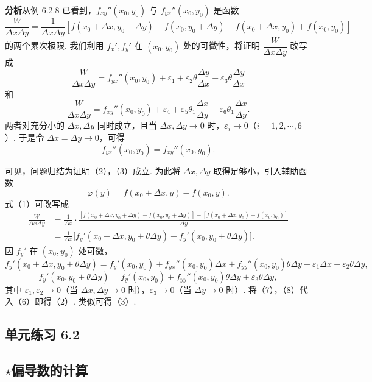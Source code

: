 \documentclass[UTF8,12pt,a4paper,fontset=fandol]{ctexart}
\begin{document}
\noindent\textbf{分析}\quad 从例 6.2.8 已看到，$f_{xy}''(x_0,y_0)$ 与 $f_{yx}''(x_0,y_0)$ 是函数
\[
  \frac{W}{\Delta x\Delta y}
  =\frac1{\Delta x\Delta y}[f(x_0+\Delta x,y_0+\Delta y)-f(x_0,y_0+\Delta y)-f(x_0+\Delta x,y_0)+f(x_0,y_0)] \tag{1}
\]
的两个累次极限. 我们利用 $f_x',f_y'$ 在 $(x_0,y_0)$ 处的可微性，将证明 $\dfrac{W}{\Delta x\Delta y}$ 改写成
\[
  \frac{W}{\Delta x\Delta y}=f_{yx}''(x_0,y_0)+\varepsilon_1+\varepsilon_2\theta\frac{\Delta y}{\Delta x}-\varepsilon_3\theta\frac{\Delta y}{\Delta x} \tag{2}
\]
和
\[
  \frac{W}{\Delta x\Delta y}=f_{xy}''(x_0,y_0)+\varepsilon_4+\varepsilon_5\theta_1\frac{\Delta x}{\Delta y}-\varepsilon_6\theta_1\frac{\Delta x}{\Delta y}. \tag{3}
\]
两者对充分小的 $\Delta x,\Delta y$ 同时成立，且当 $\Delta x,\Delta y\to0$ 时，$\varepsilon_i\to0$（$i=1,2,\cdots,6$）. 于是令 $\Delta x=\Delta y\to0$，可得
\[
  f_{yx}''(x_0,y_0)=f_{xy}''(x_0,y_0). \tag{4}
\]

可见，问题归结为证明（2），（3）成立. 为此将 $\Delta x,\Delta y$ 取得足够小，引入辅助函数
\[
  \varphi(y)=f(x_0+\Delta x,y)-f(x_0,y). \tag{5}
\]
式（1）可改写成
\begin{equation}
\begin{aligned}
\frac{W}{\Delta x\Delta y}
&=\frac1{\Delta x}\cdot
\frac{[f(x_0+\Delta x,y_0+\Delta y)-f(x_0,y_0+\Delta y)]
-[f(x_0+\Delta x,y_0)-f(x_0,y_0)]}{\Delta y}\\
&=\frac1{\Delta x}\bigl[f_y'(x_0+\Delta x,y_0+\theta\Delta y)
-f_y'(x_0,y_0+\theta\Delta y)\bigr].
\end{aligned}
\tag{6}
\end{equation}
因 $f_y'$ 在 $(x_0,y_0)$ 处可微，
\[
  f_y'(x_0+\Delta x,y_0+\theta\Delta y)
  =f_y'(x_0,y_0)+f_{yx}''(x_0,y_0)\Delta x
  +f_{yy}''(x_0,y_0)\theta\Delta y+\varepsilon_1\Delta x+\varepsilon_2\theta\Delta y, \tag{7}
\]
\[
  f_y'(x_0,y_0+\theta\Delta y)
  =f_y'(x_0,y_0)+f_{yy}''(x_0,y_0)\theta\Delta y+\varepsilon_3\theta\Delta y, \tag{8}
\]
其中 $\varepsilon_1,\varepsilon_2\to0$（当 $\Delta x,\Delta y\to0$ 时），$\varepsilon_3\to0$（当 $\Delta y\to0$ 时）. 将（7），（8）代入（6）即得（2）. 类似可得（3）.

\subsection*{单元练习 6.2}

\subsection*{\ensuremath{\star}偏导数的计算}
\end{document}
